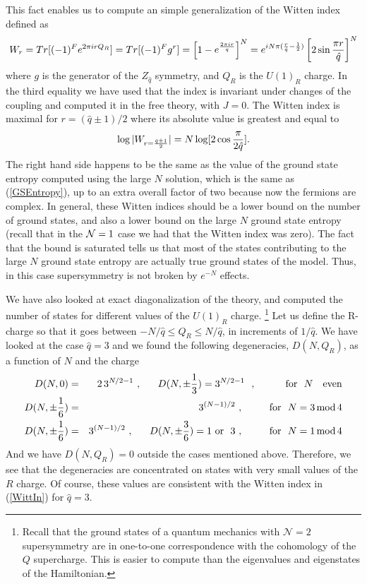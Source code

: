 \documentclass[aps,pre,preprint,onecolumn,citeautoscript,superscriptaddress,nofootinbib,eqsecnum]{revtex4-1}
\def\bea{\begin{eqnarray}}
\def\eea{\end{eqnarray}}
\def\nref#1{(\ref{#1})}
\def\be{\begin{equation}}
\def\ee{\end{equation}}
\def\half{{1 \over 2 }}
\def\la{\label}
\begin{document}
This fact enables us to compute an simple generalization of the Witten index defined as 
\be \la{WittIn}
W_r = Tr[ (-1)^F e^{ 2\pi i r Q_R } ] = Tr[ (-1)^F  g^r ] = \left[ 1 - e^{ 2 \pi i r \over q } \right]^N = e^{ i N \pi ( {r \over \hat q}  - \half ) } \left[ 2 \sin { \pi r \over \hat q } \right]^N
\ee
where $g$ is the generator of the $Z_{\hat q }$ symmetry, and $Q_R$ is the $U(1)_R$ charge. 
In the third equality we have used that the index is invariant under changes of the coupling and computed it in the free theory, with $J=0$.   
The Witten index is maximal for $ r = { (\hat q \pm 1) / 2} $ where its absolute value is greatest and equal to 
\be
\log |W_{r= {\hat q \pm 1 \over 2 } } | = N \log[ 2 \cos { \pi \over 2 \hat q } ].
\ee
The right hand side happens to be the same as the value of the ground state entropy computed using the large $N$ solution, which is the same as 
\nref{GSEntropy}, up to an extra overall factor of two because now the fermions are complex. 
In general, these Witten indices should be a lower bound on the number of ground states, and also a lower bound on the large $N$ ground state entropy
(recall that in the ${\cal N}=1$ case we had that the Witten index was zero). The fact that the bound is saturated tells us that most of the states contributing
to the large $N$ ground state entropy are actually true ground states of the model. Thus, in this case supersymmetry is not broken by $e^{- N}$ effects. 

We have also looked at exact diagonalization of the theory, and computed the number of states for different values of the $U(1)_R$ charge. \footnote{Recall that the 
ground states of a quantum mechanics with $\mathcal{N}=2$ supersymmetry are in one-to-one correspondence with the cohomology of the $Q$ supercharge. 
This is easier to compute than the eigenvalues and eigenstates of the Hamiltonian.}
Let us define the R-charge so that it goes between $-N/\hat q \leq Q_R \leq N/\hat q$, in increments of $1/\hat q$. 
We have looked at the case $\hat q =3$ and we found the following degeneracies, $D(N,Q_R)$,  as a function of  $N$ and the charge
\bea
D(N,0 ) &=& 2 \, 3^{ N/2 -1} ~,~~~~~D(N,\pm { 1 \over 3 } ) =  3^{ N/2 -1} ~~,~~~~~~~~~{\rm for}~~ N ~~~{\rm even} 
\cr D(N, \pm { 1\over 6 }) &= & 3^{ (N-1)/2} ~,~~~~~~~~ {\rm for}~~ N =3\,{\rm mod}\,4
\cr
 D(N, \pm { 1\over 6 }) &= & 3^{ (N-1)/2} ~,~~~~~D(N,\pm { 3 \over 6 } ) = 1~{\rm or} ~~3 ~,~~~~~~~~ {\rm for}~~ N =1\,{\rm mod}\,4
\eea
And we have $D(N,Q_R) =0$ outside the cases mentioned above. Therefore, we see that the degeneracies are concentrated on states with very small values of
the $R$ charge. Of course, these values are consistent with the Witten index in \nref{WittIn} for $\hat q=3$. 
\end{document}
